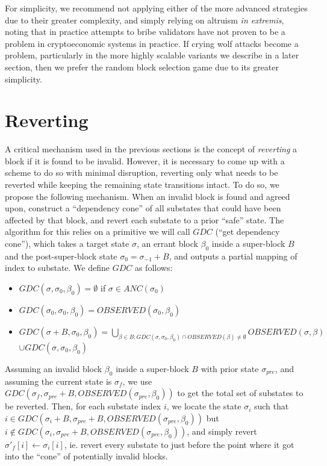 \documentclass[11pt,a4paper]{report}
\theoremstyle{plain}
\theoremstyle{definition}
\theoremstyle{remark}
\begin{document}
For simplicity, we recommend not applying either of the more advanced strategies due to their greater complexity, and simply relying on altruism \emph{in extremis}, noting that in practice attempts to bribe validators have not proven to be a problem in cryptoeconomic systems in practice. If crying wolf attacks become a problem, particularly in the more highly scalable variants we describe in a later section, then we prefer the random block selection game due to its greater simplicity.

\chapter{Reverting}

A critical mechanism used in the previous sections is the concept of \emph{reverting} a block if it is found to be invalid. However, it is necessary to come up with a scheme to do so with minimal disruption, reverting only what needs to be reverted while keeping the remaining state transitions intact. To do so, we propose the following mechanism. When an invalid block is found and agreed upon, construct a ``dependency cone'' of all substates that could have been affected by that block, and revert each substate to a prior ``safe'' state. The algorithm for this relies on a primitive we will call $GDC$ (``get dependency cone''), which takes a target state $\sigma$, an errant block $\beta_0$ inside a super-block $B$ and the post-super-block state $\sigma_0 = \sigma_{-1} + B$, and outputs a partial mapping of index to substate. We define $GDC$ as follows:

\begin{itemize}
\item
$GDC(\sigma, \sigma_0, \beta_0) = \emptyset$ if $\sigma \in ANC(\sigma_0)$
\item
$GDC(\sigma_0, \sigma_0, \beta_0) = OBSERVED(\sigma_0, \beta_0)$
\item
$GDC(\sigma + B, \sigma_0, \beta_0) = \bigcup_{\beta \in B: GDC(\sigma, \sigma_0, \beta_0) \cap OBSERVED(\beta) \ne \emptyset} OBSERVED(\sigma, \beta)$ $\cup GDC(\sigma, \sigma_0, \beta_0)$
\end{itemize}

Assuming an invalid block $\beta_0$ inside a super-block $B$ with prior state $\sigma_{pre}$, and assuming the current state is $\sigma_f$, we use $GDC(\sigma_f, \sigma_{pre} + B, OBSERVED(\sigma_{pre}, \beta_0))$ to get the total set of substates to be reverted. Then, for each substate index $i$, we locate the state $\sigma_i$ such that $i \in GDC(\sigma_i + B, \sigma_{pre} + B, OBSERVED(\sigma_{pre}, \beta_0))$ but $i \notin GDC(\sigma_i, \sigma_{pre} + B, OBSERVED(\sigma_{pre}, \beta_0))$, and simply revert $\sigma'_f[i] \leftarrow \sigma_i[i]$, ie. revert every substate to just before the point where it got into the ``cone'' of potentially invalid blocks.
\end{document}
